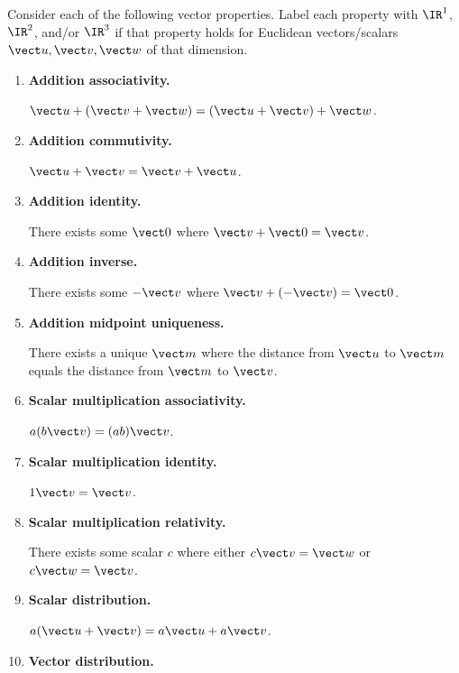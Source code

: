 
\begin{applicationActivities}{1}{7}


\begin{activity}{20}\smallSlideText
Consider each of the following vector properties. Label each property
with \(\IR^1\), \(\IR^2\), and/or \(\IR^3\) if that property holds for
Euclidean vectors/scalars \(\vect u,\vect v,\vect w\) of that dimension.
\begin{multicols}{2}
\begin{enumerate}
  \item \textbf{Addition associativity.}

        \(\vect u+(\vect v+\vect w)=
        (\vect u+\vect v)+\vect w\).
  \item \textbf{Addition commutivity.}

        \(\vect u+\vect v=
        \vect v+\vect u\).
  \item \textbf{Addition identity.}

        There exists some \(\vect 0\)
        where \(\vect v+\vect 0=\vect v\).
  \item \textbf{Addition inverse.}

        There exists some \(-\vect v\)
        where \(\vect v+(-\vect v)=\vect 0\).
  \item \textbf{Addition midpoint uniqueness.}

        There exists a unique \(\vect m\) where the distance from
        \(\vect u\) to \(\vect m\) equals the distance from \(\vect m\)
        to \(\vect v\).
  \item \textbf{Scalar multiplication associativity.}

        \(a(b\vect v)=(ab)\vect v\).
  \item \textbf{Scalar multiplication identity.}

        \(1\vect v=\vect v\).
  \item \textbf{Scalar multiplication relativity.}

        There exists some scalar \(c\) where either \(c\vect v=\vect w\)
        or \(c\vect w=\vect v\).
  \item \textbf{Scalar distribution.}

        \(a(\vect u+\vect v)=a\vect u+a\vect v\).
  \item \textbf{Vector distribution.}


\end{enumerate}
\end{multicols}
\end{activity}
\end{applicationActivities}
